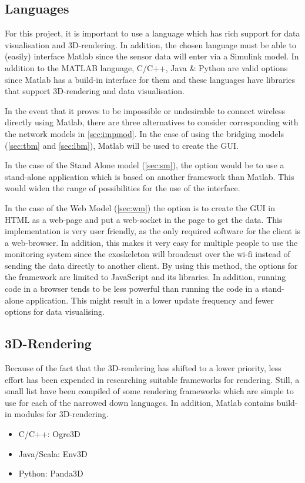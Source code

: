 \subsection{Languages}\label{sec:Languages}
For this project, it is important to use a language which has rich support for data visualisation and 3D-rendering. In addition, the chosen language must be able to (easily) interface Matlab since the sensor data will enter via a Simulink model. In addition to the MATLAB language, C/C++, Java \& Python are valid options since Matlab has a build-in interface for them and these languages have libraries that support 3D-rendering and data visualisation. 

In the event that it proves to be impossible or undesirable to connect wireless directly using Matlab, there are three alternatives to consider corresponding with the network models in \ref{sec:impmod}. In the case of using the bridging models (\ref{sec:tbm} and \ref{sec:lbm}), Matlab will be used to create the GUI. 

In the case of the Stand Alone model (\ref{sec:sm}), the option would be to use a stand-alone application which is based on another framework than Matlab. This would widen the range of possibilities for the use of the interface. 

In the case of the Web Model (\ref{sec:wm}) the option is to create the GUI in HTML as a web-page and put a web-socket in the page to get the data. This implementation is very user friendly, as the only required software for the client is a web-browser. In addition, this makes it very easy for multiple people to use the monitoring system since the exoskeleton will broadcast over the wi-fi instead of sending the data directly to another client. By using this method, the options for the framework are limited to JavaScript and its libraries. In addition, running code in a browser tends to be less powerful than running the code in a stand-alone application. This might result in a lower update frequency and fewer options for data visualising.

\subsection{3D-Rendering}\label{sec:rendering}
Because of the fact that the 3D-rendering has shifted to a lower priority, less effort has been expended in researching suitable frameworks for rendering. Still, a small list have been compiled of some rendering frameworks which are simple to use for each of the narrowed down languages. In addition, Matlab contains build-in modules for 3D-rendering.
\begin{itemize}
	\item C/C++: Ogre3D \cite{web:ogre3d}
	\item Java/Scala: Env3D \cite{web:env3d}
	\item Python: Panda3D \cite{web:panda3d}
\end{itemize}
	